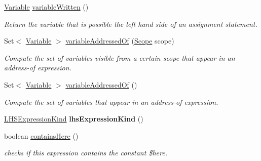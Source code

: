 \begin{DoxyCompactItemize}
\hyperlink{interfaceedu_1_1udel_1_1cis_1_1vsl_1_1civl_1_1model_1_1IF_1_1variable_1_1Variable}{Variable} \hyperlink{classedu_1_1udel_1_1cis_1_1vsl_1_1civl_1_1model_1_1common_1_1expression_1_1CommonSubscriptExpression_ad27e0e339525409d75cb2c6918144b05}{variable\+Written} ()
\begin{DoxyCompactList}\small\item\em Return the variable that is possible the left hand side of an assignment statement. \end{DoxyCompactList}\item 
Set$<$ \hyperlink{interfaceedu_1_1udel_1_1cis_1_1vsl_1_1civl_1_1model_1_1IF_1_1variable_1_1Variable}{Variable} $>$ \hyperlink{classedu_1_1udel_1_1cis_1_1vsl_1_1civl_1_1model_1_1common_1_1expression_1_1CommonSubscriptExpression_a1ef39904217e42553f012869cc6b0494}{variable\+Addressed\+Of} (\hyperlink{interfaceedu_1_1udel_1_1cis_1_1vsl_1_1civl_1_1model_1_1IF_1_1Scope}{Scope} scope)
\begin{DoxyCompactList}\small\item\em Compute the set of variables visible from a certain scope that appear in an address-\/of expression. \end{DoxyCompactList}\item 
Set$<$ \hyperlink{interfaceedu_1_1udel_1_1cis_1_1vsl_1_1civl_1_1model_1_1IF_1_1variable_1_1Variable}{Variable} $>$ \hyperlink{classedu_1_1udel_1_1cis_1_1vsl_1_1civl_1_1model_1_1common_1_1expression_1_1CommonSubscriptExpression_a5f6ffbca987264380f22f5bda09ee8bb}{variable\+Addressed\+Of} ()
\begin{DoxyCompactList}\small\item\em Compute the set of variables that appear in an address-\/of expression. \end{DoxyCompactList}\item 
\hypertarget{classedu_1_1udel_1_1cis_1_1vsl_1_1civl_1_1model_1_1common_1_1expression_1_1CommonSubscriptExpression_afe382bf002fb9f3901cf677d372a6e5b}{}\hyperlink{enumedu_1_1udel_1_1cis_1_1vsl_1_1civl_1_1model_1_1IF_1_1expression_1_1LHSExpression_1_1LHSExpressionKind}{L\+H\+S\+Expression\+Kind} {\bfseries lhs\+Expression\+Kind} ()\label{classedu_1_1udel_1_1cis_1_1vsl_1_1civl_1_1model_1_1common_1_1expression_1_1CommonSubscriptExpression_afe382bf002fb9f3901cf677d372a6e5b}

\item 
boolean \hyperlink{classedu_1_1udel_1_1cis_1_1vsl_1_1civl_1_1model_1_1common_1_1expression_1_1CommonSubscriptExpression_ac022b0916195b94d77fbd54cfb94fcc1}{contains\+Here} ()
\begin{DoxyCompactList}\small\item\em checks if this expression contains the constant \$here. \end{DoxyCompactList}\end{DoxyCompactItemize}
